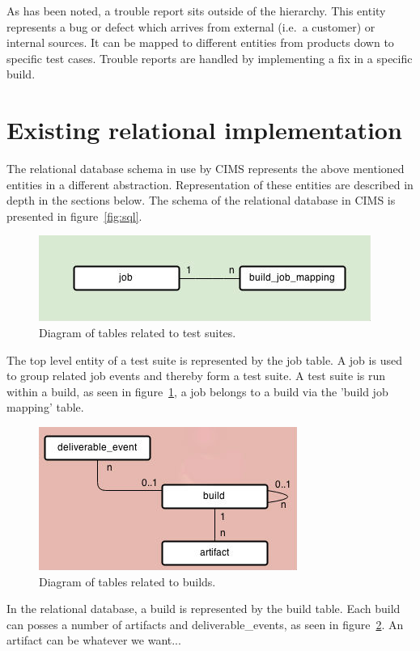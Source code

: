 As has been noted, a trouble report sits outside of the hierarchy. This entity represents a bug or defect which arrives from external (i.e.\ a customer) or internal sources. It can be mapped to different entities from products down to specific test cases. Trouble reports are handled by implementing a fix in a specific build.

\section{Existing relational implementation}
The relational database schema in use by CIMS represents the above mentioned entities in a different abstraction. Representation of these entities are described in depth in the sections below. 
The schema of the relational database in CIMS is presented in figure~\ref{fig:sql}.
\begin{figure}[h!]
\centering
\includegraphics[scale=0.5]{figure/job.jpg}
\caption{Diagram of tables related to test suites.}
\label{fig:job}
\end{figure}
The top level entity of a test suite is represented by the job table. A job is used to group related job events and thereby form a test suite. A test suite is run within a build, as seen in figure~\ref{fig:job}, a job belongs to a build via the 'build job mapping' table. 
\begin{figure}[h!]
\centering
\includegraphics[scale=0.5]{figure/build.jpg}
\caption{Diagram of tables related to builds.}
\label{fig:build}
\end{figure}
In the relational database, a build is represented by the build table. Each build can posses a number of artifacts and deliverable\_events, as seen in figure~\ref{fig:build}. An artifact can be whatever we want...

